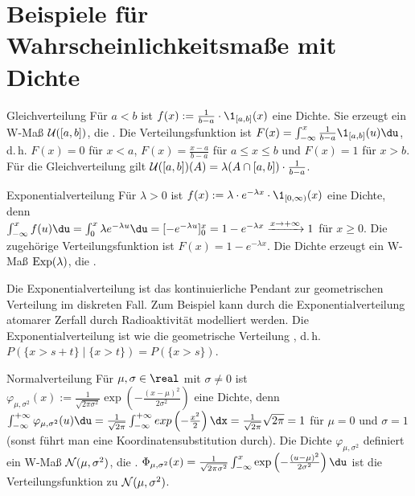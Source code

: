 \section{%
    Beispiele für Wahrscheinlichkeitsmaße mit Dichte%
}

\begin{Def}{Gleichverteilung}
    Für $a < b$ ist $f(x) := \frac{1}{b - a} \cdot \1_{[a,b]}(x)$ eine Dichte.
    Sie erzeugt ein W-Maß $\mathcal{U}([a, b])$,
    die .
    Die Verteilungsfunktion ist $F(x) = \int_{-\infty}^x \frac{1}{b - a} \1_{[a, b]}(u) \du$,
    d.\,h. $F(x) = 0$ für $x < a$, $F(x) = \frac{x - a}{b - a}$ für $a \le x \le b$
    und $F(x) = 1$ für $x > b$.
    Für die Gleichverteilung gilt $\mathcal{U}([a, b])(A) = \lambda(A \cap [a, b]) \cdot \frac{1}{b - a}$.
\end{Def}

\linie

\begin{Def}{Exponentialverteilung}
    Für $\lambda > 0$ ist $f(x) := \lambda \cdot e^{-\lambda x} \cdot \1_{[0, \infty)}(x)$
    eine Dichte, denn\\
    $\int_{-\infty}^x f(u)\du = \int_0^x \lambda e^{-\lambda u} \du =
    [-e^{-\lambda u}]_0^x = 1 - e^{-\lambda x} \xrightarrow{x \to +\infty} 1$ für $x \ge 0$.
    Die zugehörige Verteilungsfunktion ist $F(x) = 1 - e^{-\lambda x}$.
    Die Dichte erzeugt ein W-Maß $\text{Exp}(\lambda)$,
    die .
\end{Def}

\begin{Bem}
    Die Exponentialverteilung ist das kontinuierliche Pendant zur geometrischen Verteilung im
    diskreten Fall.
    Zum Beispiel kann durch die Exponentialverteilung atomarer Zerfall durch Radioaktivität
    modelliert werden.
    Die Exponentialverteilung ist wie die geometrische Verteilung , d.\,h.
    $P(\{x > s + t\} \;|\; \{x > t\}) = P(\{x > s\})$.
\end{Bem}

\linie

\begin{Def}{Normalverteilung}
    Für $\mu, \sigma \in \real$ mit $\sigma \not= 0$ ist
    $\varphi_{\mu,\sigma^2}(x) := \frac{1}{\sqrt{2\pi\sigma^2}}
    \exp\left(-\frac{(x - \mu)^2}{2\sigma^2}\right)$ eine Dichte,
    denn $\int_{-\infty}^{+\infty} \varphi_{\mu,\sigma^2}(u)\du =
    \frac{1}{\sqrt{2\pi}} \int_{-\infty}^{+\infty} exp\left(-\frac{x^2}{2}\right)\dx =
    \frac{1}{\sqrt{2\pi}} \sqrt{2\pi} = 1$ für $\mu = 0$ und $\sigma = 1$
    (sonst führt man eine Koordinatensubstitution durch).
    Die Dichte $\varphi_{\mu,\sigma^2}$ definiert ein W-Maß $\mathcal{N}(\mu, \sigma^2)$,
    die .
    $\Phi_{\mu,\sigma^2}(x) = \frac{1}{\sqrt{2\pi\sigma^2}}
    \int_{-\infty}^x \exp\left(-\frac{(u - \mu)^2}{2\sigma^2}\right) \du$
    ist die Verteilungsfunktion zu $\mathcal{N}(\mu, \sigma^2)$.
\end{Def}

